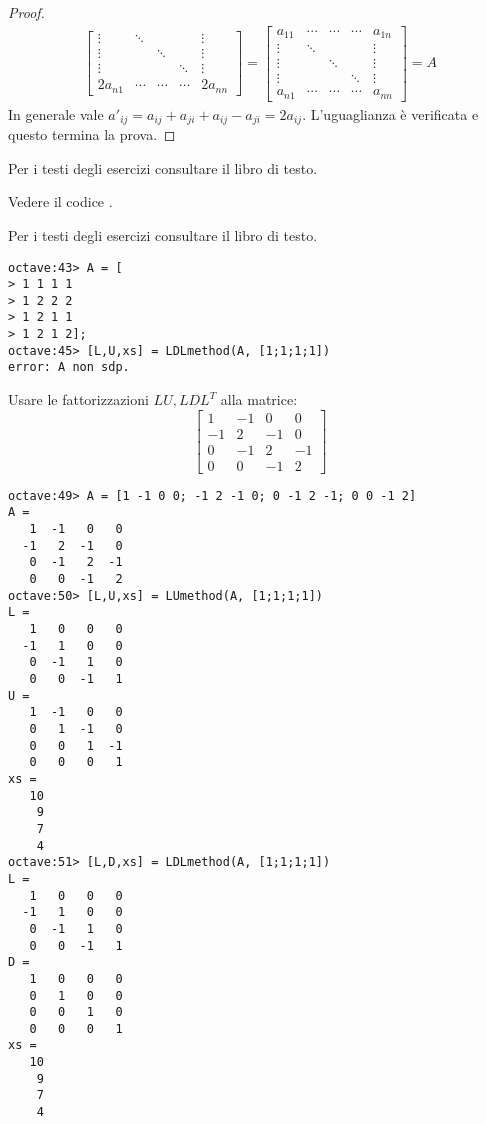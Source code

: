 \begin{proof}
\begin{displaymath}
\begin{split}
\begin{bmatrix}
\vdots & \ddots &		&		& \vdots\\
\vdots &  		& \ddots & 		& \vdots\\
\vdots & 		&		& \ddots & \vdots\\
2a_{n1}& \cdots & \cdots &\cdots & 2a_{nn}
\end{bmatrix} = 
\begin{bmatrix}
a_{11} & \cdots & \cdots &\cdots & a_{1n} \\
\vdots & \ddots &		&		& \vdots\\
\vdots &  		& \ddots & 		& \vdots\\
\vdots & 		&		& \ddots & \vdots\\
a_{n1} & \cdots & \cdots &\cdots & a_{nn}
\end{bmatrix} = A
\end{split}
\end{displaymath}
In generale vale $a'_{ij} = a_{ij} + a_{ji} + a_{ij} - a_{ji} = 2a_{ij}$.
L'uguaglianza \`e verificata e questo termina la prova.
\end{proof}

\begin{exercise}[3.16, 3.17]
Per i testi degli esercizi consultare il libro di testo.
\end{exercise}
Vedere il codice .

\begin{exercise}[3.18]
Per i testi degli esercizi consultare il libro di testo.
\end{exercise}
\begin{lstlisting}
octave:43> A = [
> 1 1 1 1
> 1 2 2 2
> 1 2 1 1
> 1 2 1 2];
octave:45> [L,U,xs] = LDLmethod(A, [1;1;1;1])
error: A non sdp.
\end{lstlisting}

\begin{exercise}
Usare le fattorizzazioni $LU, LDL^{T}$ alla matrice:
\begin{displaymath}
\begin{bmatrix}
1 & -1 & 0 & 0 \\
-1 & 2 & -1 & 0 \\
0 & -1 & 2 & -1 \\
0 & 0 & -1 & 2
\end{bmatrix}
\end{displaymath}
\end{exercise}

\begin{lstlisting}
octave:49> A = [1 -1 0 0; -1 2 -1 0; 0 -1 2 -1; 0 0 -1 2]
A =
   1  -1   0   0
  -1   2  -1   0
   0  -1   2  -1
   0   0  -1   2
octave:50> [L,U,xs] = LUmethod(A, [1;1;1;1])
L =
   1   0   0   0
  -1   1   0   0
   0  -1   1   0
   0   0  -1   1
U =
   1  -1   0   0
   0   1  -1   0
   0   0   1  -1
   0   0   0   1
xs =
   10
    9
    7
    4
octave:51> [L,D,xs] = LDLmethod(A, [1;1;1;1])
L =
   1   0   0   0
  -1   1   0   0
   0  -1   1   0
   0   0  -1   1
D =
   1   0   0   0
   0   1   0   0
   0   0   1   0
   0   0   0   1
xs =
   10
    9
    7
    4
\end{lstlisting}

